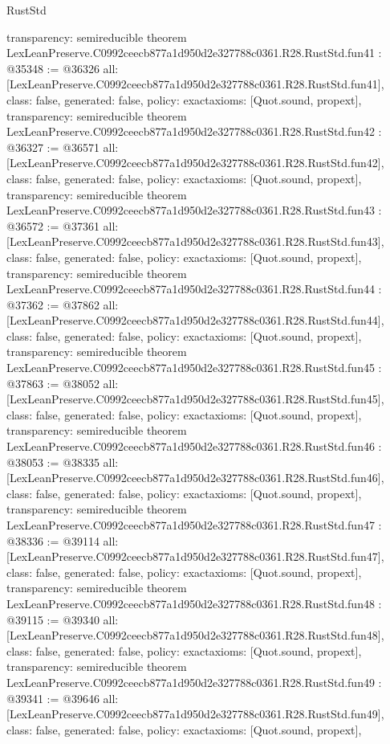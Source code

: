\begin{lexlean}{RustStd}
\begin{coremodule}
{  transparency: semireducible
}
theorem LexLeanPreserve.C0992ceecb877a1d950d2e327788c0361.R28.RustStd.fun41 : @35348 := @36326 {
  all: [LexLeanPreserve.C0992ceecb877a1d950d2e327788c0361.R28.RustStd.fun41],
  class: false,
  generated: false,
  policy: exact{axioms: [Quot.sound, propext]},
  transparency: semireducible
}
theorem LexLeanPreserve.C0992ceecb877a1d950d2e327788c0361.R28.RustStd.fun42 : @36327 := @36571 {
  all: [LexLeanPreserve.C0992ceecb877a1d950d2e327788c0361.R28.RustStd.fun42],
  class: false,
  generated: false,
  policy: exact{axioms: [Quot.sound, propext]},
  transparency: semireducible
}
theorem LexLeanPreserve.C0992ceecb877a1d950d2e327788c0361.R28.RustStd.fun43 : @36572 := @37361 {
  all: [LexLeanPreserve.C0992ceecb877a1d950d2e327788c0361.R28.RustStd.fun43],
  class: false,
  generated: false,
  policy: exact{axioms: [Quot.sound, propext]},
  transparency: semireducible
}
theorem LexLeanPreserve.C0992ceecb877a1d950d2e327788c0361.R28.RustStd.fun44 : @37362 := @37862 {
  all: [LexLeanPreserve.C0992ceecb877a1d950d2e327788c0361.R28.RustStd.fun44],
  class: false,
  generated: false,
  policy: exact{axioms: [Quot.sound, propext]},
  transparency: semireducible
}
theorem LexLeanPreserve.C0992ceecb877a1d950d2e327788c0361.R28.RustStd.fun45 : @37863 := @38052 {
  all: [LexLeanPreserve.C0992ceecb877a1d950d2e327788c0361.R28.RustStd.fun45],
  class: false,
  generated: false,
  policy: exact{axioms: [Quot.sound, propext]},
  transparency: semireducible
}
theorem LexLeanPreserve.C0992ceecb877a1d950d2e327788c0361.R28.RustStd.fun46 : @38053 := @38335 {
  all: [LexLeanPreserve.C0992ceecb877a1d950d2e327788c0361.R28.RustStd.fun46],
  class: false,
  generated: false,
  policy: exact{axioms: [Quot.sound, propext]},
  transparency: semireducible
}
theorem LexLeanPreserve.C0992ceecb877a1d950d2e327788c0361.R28.RustStd.fun47 : @38336 := @39114 {
  all: [LexLeanPreserve.C0992ceecb877a1d950d2e327788c0361.R28.RustStd.fun47],
  class: false,
  generated: false,
  policy: exact{axioms: [Quot.sound, propext]},
  transparency: semireducible
}
theorem LexLeanPreserve.C0992ceecb877a1d950d2e327788c0361.R28.RustStd.fun48 : @39115 := @39340 {
  all: [LexLeanPreserve.C0992ceecb877a1d950d2e327788c0361.R28.RustStd.fun48],
  class: false,
  generated: false,
  policy: exact{axioms: [Quot.sound, propext]},
  transparency: semireducible
}
theorem LexLeanPreserve.C0992ceecb877a1d950d2e327788c0361.R28.RustStd.fun49 : @39341 := @39646 {
  all: [LexLeanPreserve.C0992ceecb877a1d950d2e327788c0361.R28.RustStd.fun49],
  class: false,
  generated: false,
  policy: exact{axioms: [Quot.sound, propext]},
}
\end{coremodule}
\end{lexlean}
